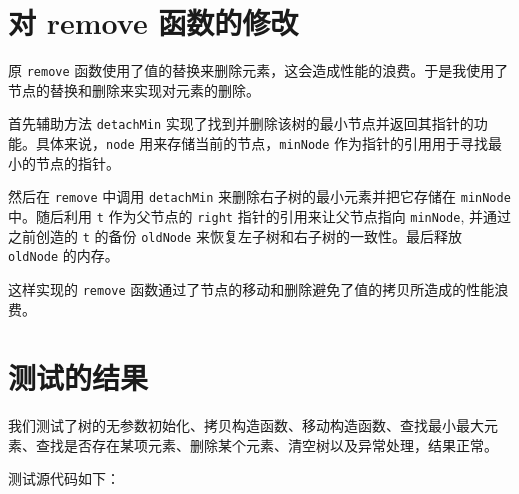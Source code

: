 \documentclass[UTF8]{ctexart}
\begin{document}
\pagestyle{fancy}
\fancyhead{}

\section{对 remove 函数的修改}

原 \verb|remove| 函数使用了值的替换来删除元素，这会造成性能的浪费。于是我使用了节点的替换和删除来实现对元素的删除。

首先辅助方法 \verb|detachMin| 实现了找到并删除该树的最小节点并返回其指针的功能。具体来说，\verb|node| 用来存储当前的节点，\verb|minNode| 作为指针的引用用于寻找最小的节点的指针。

然后在 \verb|remove| 中调用 \verb|detachMin| 来删除右子树的最小元素并把它存储在 \verb|minNode| 中。随后利用 \verb|t| 作为父节点的 \verb|right| 指针的引用来让父节点指向 \verb|minNode|, 并通过之前创造的 \verb|t| 的备份 \verb|oldNode| 来恢复左子树和右子树的一致性。最后释放 \verb|oldNode| 的内存。

这样实现的 \verb|remove| 函数通过了节点的移动和删除避免了值的拷贝所造成的性能浪费。

\section{测试的结果}

我们测试了树的无参数初始化、拷贝构造函数、移动构造函数、查找最小最大元素、查找是否存在某项元素、删除某个元素、清空树以及异常处理，结果正常。

测试源代码如下：
\end{document}
